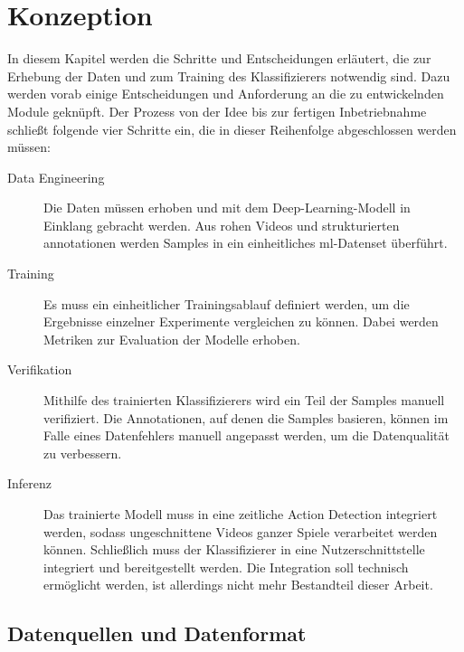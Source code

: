 \chapter{Konzeption}
\label{ch:concept}

In diesem Kapitel werden die Schritte und Entscheidungen erläutert, die zur Erhebung der Daten und zum Training des Klassifizierers notwendig sind.
Dazu werden vorab einige Entscheidungen und Anforderung an die zu entwickelnden Module geknüpft.
Der Prozess von der Idee bis zur fertigen Inbetriebnahme schließt folgende vier Schritte ein, die in dieser Reihenfolge abgeschlossen werden müssen:

\begin{description}
    \item[Data Engineering] Die Daten müssen erhoben und mit dem Deep-Learning-Modell in Einklang gebracht werden.
    Aus rohen Videos und strukturierten \gls{annotationen} werden Samples in ein einheitliches \gls{ml}-Datenset überführt.
    \item[Training] Es muss ein einheitlicher Trainingsablauf definiert werden, um die Ergebnisse einzelner Experimente vergleichen zu können.
    Dabei werden Metriken zur Evaluation der Modelle erhoben.
    \item[Verifikation] Mithilfe des trainierten Klassifizierers wird ein Teil der Samples manuell verifiziert.
    Die Annotationen, auf denen die Samples basieren, können im Falle eines Datenfehlers manuell angepasst werden, um die Datenqualität zu verbessern.
    \item[Inferenz] Das trainierte Modell muss in eine zeitliche Action Detection integriert werden, sodass ungeschnittene Videos ganzer Spiele verarbeitet werden können.
    Schließlich muss der Klassifizierer in eine Nutzerschnittstelle integriert und bereitgestellt werden.
    Die Integration soll technisch ermöglicht werden, ist allerdings nicht mehr Bestandteil dieser Arbeit.
\end{description}

\section{Datenquellen und Datenformat}
\label{sec:datenquellen}

